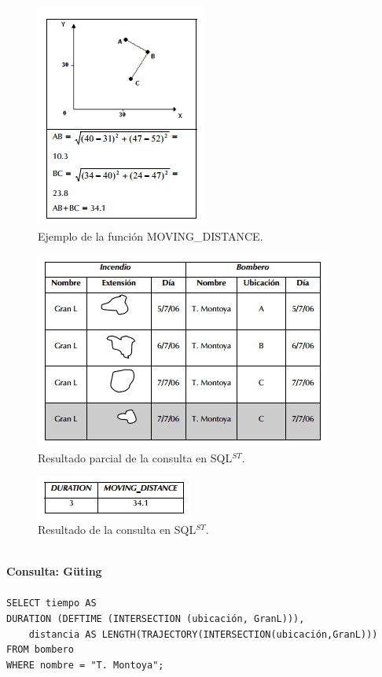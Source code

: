 \documentclass[a4paper,12pt,oneside]{report}
\begin{document}
\begin{figure}
\center
\includegraphics[scale=0.6]{images/funcionmovingdistance.png}
\caption{Ejemplo de la funci\'on MOVING\_DISTANCE.}
\end{figure}

\begin{figure}
\center
\includegraphics[scale=0.6]{images/consulta3sqlst.png}

\caption{Resultado parcial de la consulta en SQL$^{ST}$.}
\end{figure}

\begin{figure}
\center
\includegraphics[scale=0.6]{images/consulta3sqlst2.png}
\caption{Resultado de la consulta en SQL$^{ST}$.}
\end{figure}

\ \\
\noindent \textbf{Consulta: G\"uting}\\
\ \\
\texttt{SELECT tiempo AS\\
DURATION (DEFTIME (INTERSECTION (ubicaci\'on, GranL))),\\
\ \ \ \ distancia AS LENGTH(TRAJECTORY(INTERSECTION(ubicaci\'on,GranL)))\\
FROM bombero\\
WHERE nombre = "T. Montoya";}
\end{document}
